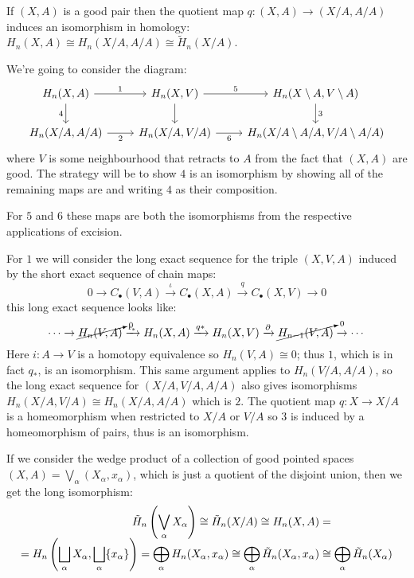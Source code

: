 \documentclass[a4paper]{article}
\begin{document}
\begin{prop}
    If $(X,A)$ is a good pair then the quotient map $q:(X,A)\rightarrow(X/A,A/A)$ induces an isomorphism in homology: $H_n(X,A)\cong H_n(X/A,A/A) \cong \tilde{H}_n(X/A)$.
    \begin{prf}
        We're going to consider the diagram:
        \[\begin{tikzcd}
            H_n(X,A) \arrow[r, "1"] \arrow[d, "4", swap] & H_n(X,V) \arrow[r, "5"] \arrow[d] & H_n(X\setminus A, V\setminus A) \arrow[d, "3"]\\
            H_n(X/A,A/A) \arrow[r, "2", swap] & H_n(X/A,V/A) \arrow[r, "6", swap] & H_n(X/A\setminus A/A, V/A\setminus A/A)
        \end{tikzcd}\]
        where $V$ is some neighbourhood that retracts to $A$ from the fact that $(X,A)$ are good. The strategy will be to show $4$ is an isomorphism by showing all of the remaining maps are and writing $4$ as their composition.
        
        For $5$ and $6$ these maps are both the isomorphisms from the respective applications of excision.

        For $1$ we will consider the long exact sequence for the triple $(X,V,A)$ induced by the short exact sequence of chain maps: \[
        0\rightarrow C_\bullet(V,A) \xrightarrow{\iota} C_\bullet(X,A) \xrightarrow{q} C_\bullet(X,V) \rightarrow 0
        \]
        this long exact sequence looks like: \[
        \cdots\rightarrow \cancelto{_0}{H_n(V,A)} \xrightarrow{\iota_*} H_n(X,A) \xrightarrow{q*} H_n(X,V) \xrightarrow{\partial} \cancelto{_0}{H_{n-1}(V,A)} \rightarrow \cdots
        \] %
        Here $i:A\rightarrow V$ is a homotopy equivalence so $H_n(V,A)\cong 0$; thus $1$, which is in fact $q_*$, is an isomorphism. This same argument applies to $H_n(V/A,A/A)$, so the long exact sequence for $(X/A,V/A,A/A)$ also gives isomorphisms $H_n(X/A,V/A)\cong H_n(X/A,A/A)$ which is $2$. The quotient map $q:X\rightarrow X/A$ is a homeomorphism when restricted to $X/A$ or $V/A$ so $3$ is induced by a homeomorphism of pairs, thus is an isomorphism.
    \end{prf}
\end{prop}
If we consider the wedge product of a collection of good pointed spaces $(X,A)=\bigvee_\alpha(X_\alpha,x_\alpha)$, which is just a quotient of the disjoint union, then we get the long isomorphism: 
\begin{align*}
    \tilde{H}_n\left( \bigvee_\alpha X_\alpha \right) \cong \tilde{H}_n(X/A)\cong H_n(X,A) &= \\[-5pt]
    = H_n\left( \bigsqcup_\alpha X_\alpha,\bigsqcup_\alpha\{x_\alpha\} \right) = \bigoplus_\alpha H_n(X_\alpha,x_\alpha)\cong \bigoplus_\alpha \tilde{H}_n(X_\alpha,x_\alpha) &\cong \bigoplus_\alpha\tilde{H}_n(X_\alpha)
\end{align*}
\end{document}
